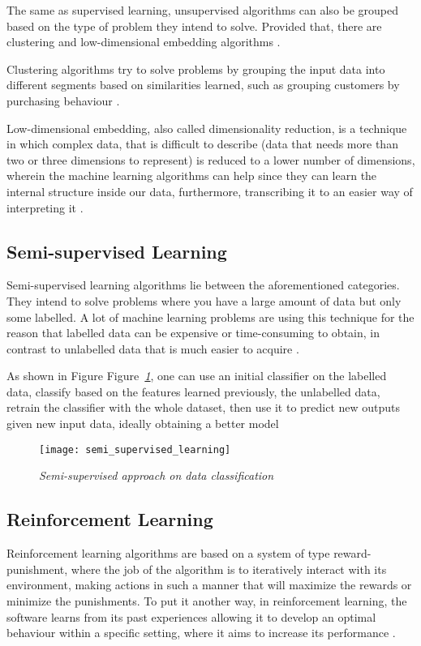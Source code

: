 The same as supervised learning, unsupervised algorithms can also be grouped
based on the type of problem they intend to solve. Provided that,
there are clustering and low-dimensional embedding algorithms \cite{amai}.

Clustering algorithms try to solve problems by grouping the input data
into different segments based on similarities learned,
such as grouping customers by purchasing behaviour \cite{brownlee2016master}.


Low-dimensional embedding, also called dimensionality reduction,
is a technique in which complex data, that is difficult to describe
(data that needs more than two or three dimensions to represent)
is reduced to a lower number of dimensions,
wherein the machine learning algorithms can help
since they can learn the internal structure inside our data, furthermore,
transcribing it to an easier way of interpreting it \cite{amai}.


\subsection{Semi-supervised Learning}
Semi-supervised learning algorithms lie between the aforementioned categories.
They intend to solve problems where you have a large amount of data but only some labelled.
A lot of machine learning problems are using this technique for the reason that
labelled data can be expensive or time-consuming to obtain,
in contrast to unlabelled data that is much easier to acquire \cite{brownlee2016master}.

As shown in Figure Figure\emph{~\ref{fig:semi_supervised_learning}}, one can use an initial classifier on the labelled data,
classify based on the features learned previously, the unlabelled data,
retrain the classifier with the whole dataset,
then use it to predict new outputs given new input data, ideally obtaining a better model \cite{lotte2015}

\begin{figure}[h]
    \centering
    \texttt{[image: semi\_supervised\_learning]}
    \caption{\emph{Semi-supervised approach on data classification \cite{lotte2015}}}
    \label{fig:semi_supervised_learning}
\end{figure}

\subsection{Reinforcement Learning}
Reinforcement learning algorithms are based on a system of type reward-punishment,
where the job of the algorithm is to iteratively interact with its environment,
making actions in such a manner that will maximize the rewards or minimize the punishments.
To put it another way, in reinforcement learning,
the software learns from its past experiences allowing it to develop an optimal
behaviour within a specific setting, where it aims to increase its performance \cite{typesMLMedium}.

